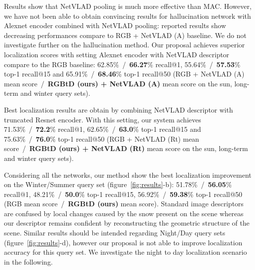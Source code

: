 Results show that NetVLAD pooling is much more effective than MAC. However, we have not been able to obtain convincing results for hallucination network with Alexnet encoder combined with NetVLAD pooling: reported results show decreasing performances compare to RGB + NetVLAD (A) baseline. We do not investigate further on the hallucination method. Our proposal achieves superior localization scores with setting Alexnet encoder with NetVLAD descriptor compare to the RGB baseline: 62.85\%~/~\textbf{66.27}\% recall@1, 55.64\%~/~\textbf{57.53}\% top-1 recall@15 and 65.91\%~/~\textbf{68.46}\% top-1 recall@50  (RGB + NetVLAD (A) mean score~/~\textbf{RGBtD (ours) + NetVLAD (A)} mean score on the sun, long-term and winter query sets).

Best localization results are obtain by combining NetVLAD descriptor with truncated Resnet encoder. With this setting, our system achieves 71.53\%~/~\textbf{72.2}\% recall@1, 62.65\%~/~\textbf{63.0}\% top-1 recall@15 and 75.63\%~/~\textbf{76.0}\% top-1 recall@50  (RGB + NetVLAD (Rt) mean score~/~\textbf{RGBtD (ours) + NetVLAD (Rt)} mean score on the sun, long-term and winter query sets).

Considering all the networks, our method show the best localization improvement on the Winter/Summer query set (figure~\ref{fig:results}-b): 51.78\%~/~\textbf{56.05}\% recall@1, 48.21\%~/~\textbf{50.0}\% top-1 recall@15, 56.92\%~/~\textbf{59.38}\% top-1 recall@50  (RGB mean score~/~\textbf{RGBtD (ours)} mean score). Standard image descriptors are confused by local changes caused by the snow present on the scene whereas our descriptor remains confident by reconstructing the geometric structure of the scene. Similar results should be intended regarding Night/Day query sets (figure~\ref{fig:results}-d), however our proposal is not able to improve localization accuracy for this query set. We investigate the night to day localization scenario in the following.

